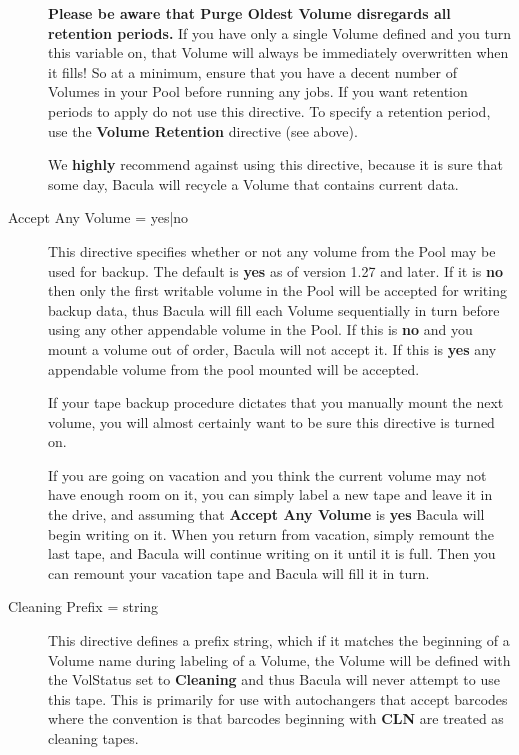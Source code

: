 \begin{description}
{\bf Please be aware that {\bf Purge Oldest Volume} disregards  all retention
periods.} If you have only a single Volume  defined and you turn this variable
on, that Volume will always  be immediately overwritten when it fills! So at a
minimum,  ensure that you have a decent number of Volumes in your Pool  before
running any jobs. If you want retention periods to apply  do not use this
directive. To specify a retention period,  use the {\bf Volume Retention}
directive (see above).  

We {\bf highly} recommend against using this directive, because it is sure that
some day, Bacula will recycle a Volume that contains current data.

\item [Accept Any Volume = \lt{}yes|no\gt{}]
   This directive  specifies whether or not any volume from the Pool may  be used
for backup. The default is {\bf yes} as of version  1.27 and later. If it is
{\bf no} then only the first  writable volume in the Pool will be accepted for
writing backup  data, thus Bacula will fill each Volume sequentially  in turn
before using any other appendable volume in the  Pool. If this is {\bf no} and
you mount a volume out  of order, Bacula will not accept it. If this  is {\bf
yes} any appendable volume from the pool  mounted will be accepted.  

If your tape backup procedure dictates that you manually  mount the next
volume, you will almost certainly want to be  sure this directive is turned
on.  

If you are going on vacation and you think the current volume  may not have
enough room on it, you can simply label a new tape  and leave it in the drive,
and assuming that {\bf Accept Any Volume}  is {\bf yes} Bacula will begin
writing on it. When you return  from vacation, simply remount the last tape,
and Bacula will  continue writing on it until it is full. Then you can remount
 your vacation tape and Bacula will fill it in turn.  

\item [Cleaning Prefix = \lt{}string\gt{}]
   This directive defines  a prefix string, which if it matches the beginning of 
a Volume name during labeling of a Volume, the Volume  will be defined with
the VolStatus set to {\bf Cleaning} and  thus Bacula will never attempt to use
this tape. This  is primarily for use with autochangers that accept barcodes 
where the convention is that barcodes beginning with {\bf CLN}  are treated as
cleaning tapes.  
\label{Label}


\end{description}
